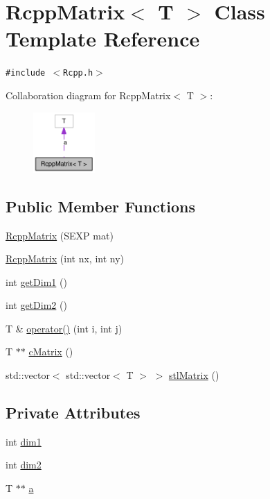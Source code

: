 \hypertarget{classRcppMatrix}{
\section{RcppMatrix$<$ T $>$ Class Template Reference}
\label{classRcppMatrix}
}
{\tt \#include $<$Rcpp.h$>$}

Collaboration diagram for RcppMatrix$<$ T $>$:\nopagebreak
\begin{figure}[H]
\begin{center}
\leavevmode
\includegraphics[width=67pt]{classRcppMatrix__coll__graph}
\end{center}
\end{figure}
\subsection*{Public Member Functions}
\begin{CompactItemize}
\item 
\hyperlink{classRcppMatrix_6cdd09180c21b504d1455ae2bc8939a7}{RcppMatrix} (SEXP mat)
\item 
\hyperlink{classRcppMatrix_9ac16e2fcccd2a21a33097139e4ec253}{RcppMatrix} (int nx, int ny)
\item 
int \hyperlink{classRcppMatrix_edbe27d643d704a0f5a995821307fdaf}{getDim1} ()
\item 
int \hyperlink{classRcppMatrix_356e04f844e3ebfac29b50e2e749734f}{getDim2} ()
\item 
T \& \hyperlink{classRcppMatrix_7733c87524d7e216f70fc10ccc971a29}{operator()} (int i, int j)
\item 
T $\ast$$\ast$ \hyperlink{classRcppMatrix_e94a95b2125bd594965e26a93c994da4}{cMatrix} ()
\item 
std::vector$<$ std::vector$<$ T $>$ $>$ \hyperlink{classRcppMatrix_e74547edb5d989adb87b2e483153de89}{stlMatrix} ()
\end{CompactItemize}
\subsection*{Private Attributes}
\begin{CompactItemize}
\item 
int \hyperlink{classRcppMatrix_3b2f3ef7c2b482e4f7e7f4f96b787128}{dim1}
\item 
int \hyperlink{classRcppMatrix_d01bc64d89dcc475f7c90f1580bf5d52}{dim2}
\item 
T $\ast$$\ast$ \hyperlink{classRcppMatrix_3f4dad8e2aed525c9b20e98d262ec31e}{a}
\end{CompactItemize}


